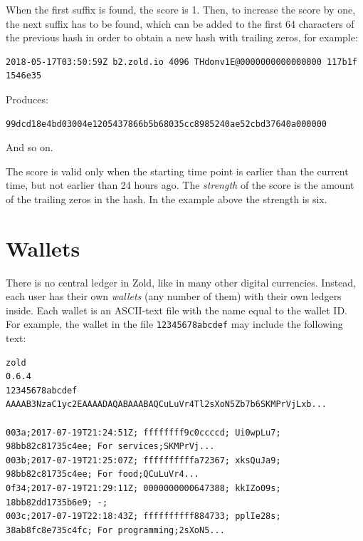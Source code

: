 \documentclass[11pt,oneside]{article}
\newcommand\dd[1]{\colorbox{gray!30}{\texttt{#1}}}
\begin{document}
When the first suffix is found, the score is 1. Then, to
increase the score by one, the next suffix has to be found, which
can be added to the first 64 characters of the previous hash
in order to obtain a new hash with trailing zeros, for example:

\begin{verbatim}
2018-05-17T03:50:59Z b2.zold.io 4096 THdonv1E@0000000000000000 117b1f 1546e35
\end{verbatim}

Produces:

\begin{verbatim}
99dcd18e4bd03004e1205437866b5b68035cc8985240ae52cbd37640a000000
\end{verbatim}

And so on.

The score is valid only when the starting time point is earlier than
the current time, but not earlier than 24 hours ago. The \emph{strength} of the score
is the amount of the trailing zeros in the hash. In the example above the
strength is six.

\section{Wallets}

There is no central ledger in Zold, like in many other digital currencies.
Instead, each user has their own \emph{wallets} (any number of them) with their own ledgers inside.
Each wallet is an ASCII-text file with the name equal to the wallet ID.
For example, the wallet in the file \dd{12345678abcdef} may include
the following text:

\begin{verbatim}
zold
0.6.4
12345678abcdef
AAAAB3NzaC1yc2EAAAADAQABAAABAQCuLuVr4Tl2sXoN5Zb7b6SKMPrVjLxb...

003a;2017-07-19T21:24:51Z; ffffffff9c0ccccd; Ui0wpLu7; 98bb82c81735c4ee; For services;SKMPrVj...
003b;2017-07-19T21:25:07Z; ffffffffffa72367; xksQuJa9; 98bb82c81735c4ee; For food;QCuLuVr4...
0f34;2017-07-19T21:29:11Z; 0000000000647388; kkIZo09s; 18bb82dd1735b6e9; -;
003c;2017-07-19T22:18:43Z; ffffffffff884733; pplIe28s; 38ab8fc8e735c4fc; For programming;2sXoN5...
\end{verbatim}
\end{document}
